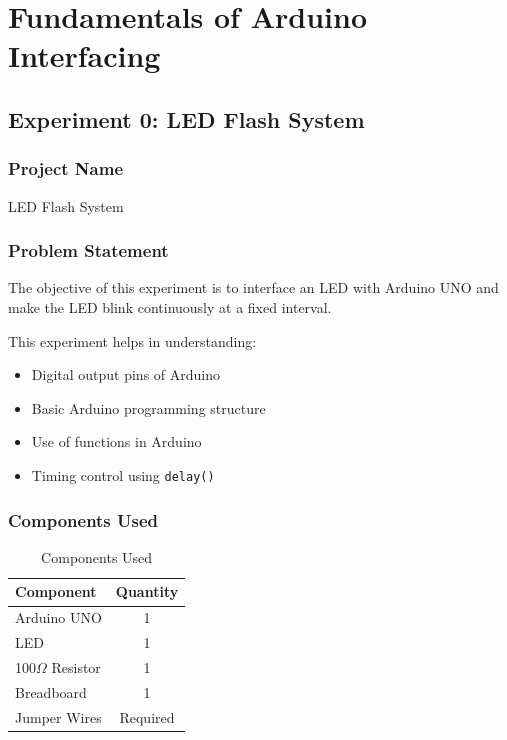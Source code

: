 \chapter{Fundamentals of Arduino Interfacing}

\section{Experiment 0: LED Flash System}

\subsection{Project Name}

LED Flash System

\subsection{Problem Statement}

The objective of this experiment is to interface an LED with Arduino UNO and make the LED blink continuously at a fixed interval.

This experiment helps in understanding:

\begin{itemize}
    \item Digital output pins of Arduino
    \item Basic Arduino programming structure
    \item Use of functions in Arduino
    \item Timing control using \texttt{delay()}
\end{itemize}


\subsection{Components Used}

\begin{table}[H]
\centering
\caption{Components Used}
\begin{tabular}{|l|c|}
\hline
\textbf{Component} & \textbf{Quantity} \\
\hline
Arduino UNO & 1 \\
LED & 1 \\
100$\Omega$ Resistor & 1 \\
Breadboard & 1 \\
Jumper Wires & Required \\
\hline
\end{tabular}
\end{table}

